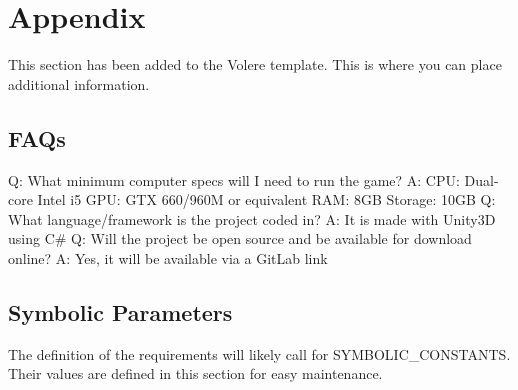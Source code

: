 \documentclass[12pt, titlepage]{article}
\begin{document}





\newpage

\section{Appendix}

This section has been added to the Volere template.  This is where you can place
additional information.

\subsection{FAQs}

Q: What minimum computer specs will I need to run the game?
\newline
A: CPU: Dual-core Intel i5    
GPU: GTX 660/960M or equivalent
RAM: 8GB
Storage: 10GB
\newline
\newline
Q: What language/framework is the project coded in?
\newline
A: It is made with Unity3D using C\#
\newline
\newline
Q: Will the project be open source and be available for download online?
\newline
A: Yes, it will be available via a GitLab link

\subsection{Symbolic Parameters}

The definition of the requirements will likely call for SYMBOLIC\_CONSTANTS.
Their values are defined in this section for easy maintenance.
\end{document}
